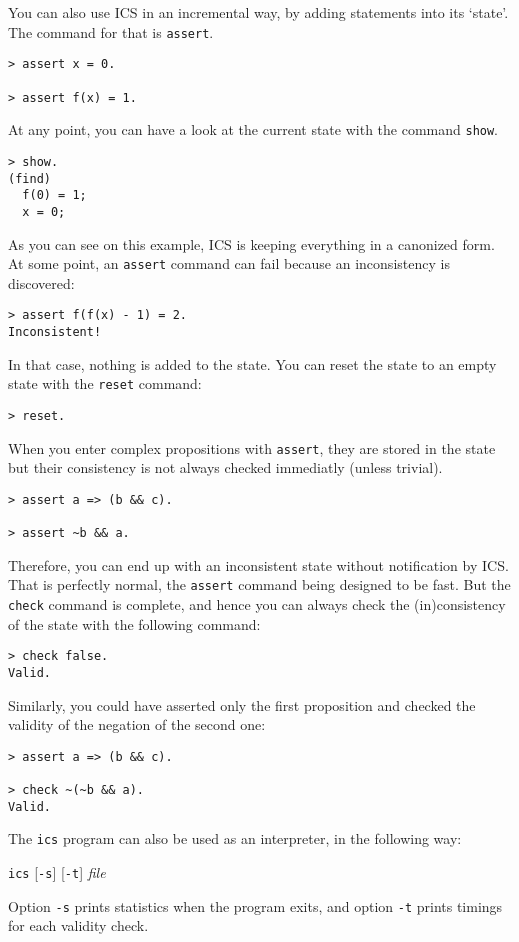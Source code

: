 \documentclass[12pt]{article}
\begin{document}
You can also use ICS in an incremental way, by adding statements into
its `state'. The command for that is \texttt{assert}.
\begin{verbatim}
> assert x = 0.

> assert f(x) = 1.
\end{verbatim}
At any point, you can have a look at the current state with the
command \texttt{show}.
\begin{verbatim}
> show.
(find)
  f(0) = 1;
  x = 0;
\end{verbatim}
As you can see on this example, ICS is keeping everything in a
canonized form. 
At some point, an \texttt{assert} command can fail because an
inconsistency is discovered:
\begin{verbatim}
> assert f(f(x) - 1) = 2.
Inconsistent!
\end{verbatim}
In that case, nothing is added to the state.
You can reset the state to an empty state with the \texttt{reset}
command:
\begin{verbatim}
> reset.          
\end{verbatim}
When you enter complex propositions with \texttt{assert}, they are
stored in the state but their consistency is not always checked
immediatly (unless trivial).
\begin{verbatim}
> assert a => (b && c).

> assert ~b && a.
\end{verbatim}
Therefore, you can end up with an inconsistent state without
notification by ICS.  That is perfectly normal, the \texttt{assert}
command being designed to be fast. But the \texttt{check} command is
complete, and hence you can always check the (in)consistency of the
state with the following command:
\begin{verbatim}
> check false.
Valid.
\end{verbatim}
Similarly, you could have asserted only the first proposition and
checked the validity of the negation of the second one:
\begin{verbatim}
> assert a => (b && c).

> check ~(~b && a).
Valid.
\end{verbatim}

\bigskip
The \texttt{ics} program can also be used as an interpreter, in the
following way:
\begin{center}
  \texttt{ics} [\texttt{-s}] [\texttt{-t}] \textit{file}
\end{center}
Option \texttt{-s} prints statistics when the program exits, and
option \texttt{-t} prints timings for each validity check.
\end{document}
